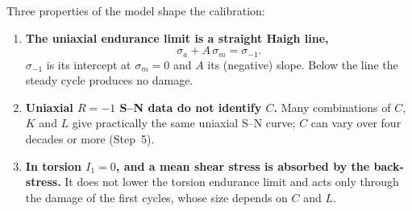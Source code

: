 \documentclass[11pt,a4paper]{article}
\newcommand{\sigm}{\sigma_{-1}}
\begin{document}
Three properties of the model shape the calibration:
\begin{enumerate}[label=(P\arabic*)]
\item \textbf{The uniaxial endurance limit is a straight Haigh line,}
  \begin{equation}
    \sigma_a + A\,\sigma_m = \sigm .
    \label{eq:haigh}
  \end{equation}
  $\sigm$ is its intercept at $\sigma_m=0$ and $A$ its (negative) slope. Below the line the steady cycle produces no
  damage.
\item \textbf{Uniaxial $R=-1$ S--N data do not identify $C$.} Many combinations of $C$, $K$ and $L$ give practically
  the same uniaxial S--N curve; $C$ can vary over four decades or more (Step~5).
\item \textbf{In torsion $I_1=0$, and a mean shear stress is absorbed by the back-stress.} It does not lower the
  torsion endurance limit and acts only through the damage of the first cycles, whose size depends on $C$ and $L$.
\end{enumerate}

\FloatBarrier
\end{document}
